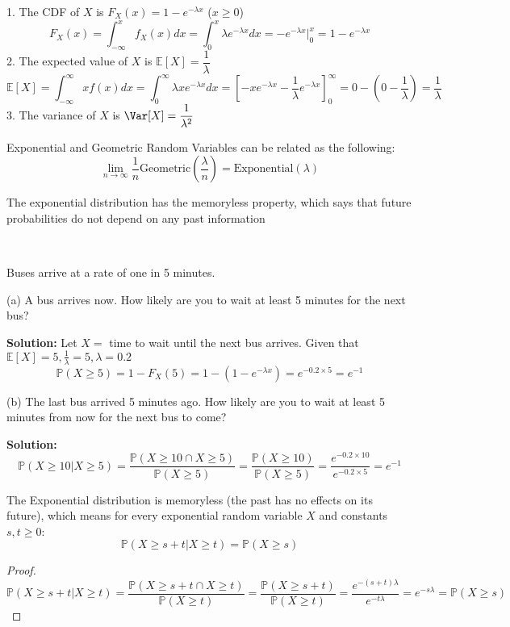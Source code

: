 1. The CDF of \(X\) is \(F_X(x) = 1 - e^{-\lambda x}\) (\(x \geq 0\))
\[
    F_X(x) = \int_{-\infty}^x f_X(x) dx = \int_{0}^x \lambda e^{-\lambda x} dx = -e^{-\lambda x} \Big|_0^x = 1 - e^{- \lambda x}
\]
2. The expected value of \(X\) is \(\mathbb{E}[X] = \dfrac{1}{\lambda}\)
\[
\mathbb{E}[X] = \int_{-\infty }^{\infty} xf(x) dx = \int_{0}^{\infty} \lambda x e^{-\lambda x} dx = \left[-xe^{-\lambda x} - \dfrac{1}{\lambda }e^{-\lambda x}\right]_0^{\infty} = 0 - (0 -\dfrac{1}{\lambda }) = \dfrac{1}{\lambda}
\]
3. The variance of \(X\) is \(\Var[X] = \dfrac{1}{\lambda^2}\) 

Exponential and Geometric Random Variables can be related as the following:
\[
    \lim_{n \to \infty} \dfrac{1}{n} \text{Geometric}(\dfrac{\lambda}{n}) = \text{Exponential}(\lambda) 
\]

The exponential distribution has the memoryless property, which says that future probabilities do not depend on any past information

\begin{eg}~ 

    Buses arrive at a rate of one in 5 minutes. 

    (a) A bus arrives now. How likely are you to wait at least 5 minutes for the next bus?

    \textbf{Solution:} 
    Let \(X = \) time to wait until the next bus arrives. Given that \(\mathbb{E}[X] = 5, \frac{1}{\lambda} = 5, \lambda = 0.2\) 
    \[
        \mathbb{P}(X \geq 5) = 1 - F_X(5) = 1 - (1 - e^{-\lambda x}) = e^{-0.2 \times 5} = e^{-1}
    \]

    (b) The last bus arrived 5 minutes ago. How likely are you to wait at least 5 minutes from now for the next bus to come?

    \textbf{Solution:} 
    \[
        \mathbb{P}(X \geq 10 \vert X \geq 5) = \dfrac{\mathbb{P}(X \geq 10 \cap X \geq 5)}{\mathbb{P}(X \geq 5)} = \dfrac{\mathbb{P}(X \geq 10)}{\mathbb{P}(X \geq 5)} = \dfrac{e^{-0.2 \times 10}}{e^{-0.2 \times 5}} = e^{-1}
    \]
\end{eg}

The Exponential distribution is memoryless (the past has no effects on
its future), which means for every exponential random variable \(X\) and
constants \(s, t \geq 0\): 
\[
    \mathbb{P}(X \geq s + t \vert X \geq t) = \mathbb{P}(X \geq s)
\] 
\begin{proof}
    \[
        \mathbb{P}(X \geq s + t \vert X \geq t) = \dfrac{\mathbb{P}(X \geq s + t \cap X \geq t)}{\mathbb{P}(X \geq t)} = \dfrac{\mathbb{P}(X \geq s + t)}{\mathbb{P}(X \geq t)} = \dfrac{e^{-(s + t)\lambda}}{e^{-t\lambda}} = e^{-s\lambda} = \mathbb{P}(X \geq s)
    \]
\end{proof}

